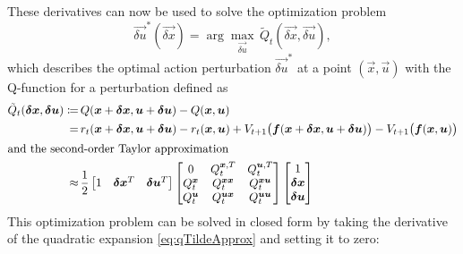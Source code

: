 			These derivatives can now be used to solve the optimization problem
			\begin{equation*}
				\vec{\delta u}^\ast(\vec{\delta x}) = \arg\max_{\vec{\delta u}}\, \tilde{Q}_t(\vec{\delta x}, \vec{\delta u}),
			\end{equation*}
			which describes the optimal action perturbation \( \vec{\delta u}^\ast \) at a point \( (\vec{x}, \vec{u}) \) with the Q-function for a perturbation defined as
			\begin{align}
				\tilde{Q}_t(\vec{\delta x}, \vec{\delta u})
				\coloneqq & \, Q(\vec{x} + \vec{\delta x}, \vec{u} + \vec{\delta u}) - Q(\vec{x}, \vec{u})  \nonumber                                                                                                                                          \\
				=         & \, r_t(\vec{x} + \vec{\delta x}, \vec{u} + \vec{\delta u}) - r_t(\vec{x}, \vec{u}) + V_{t + 1}\big( \vec{f}(\vec{x} + \vec{\delta x}, \vec{u} + \vec{\delta u}) \big) -  V_{t + 1}\big( \vec{f}(\vec{x}, \vec{u}) \big)  \nonumber \\
				\intertext{and the second-order Taylor approximation}
				\approx   & \, \frac{1}{2}
				\begin{bmatrix}
					1 & \vec{\delta x}^T & \vec{\delta u}^T
				\end{bmatrix}
				\begin{bmatrix}
					0             & Q_t^{\vec{x}, T}      & Q_t^{\vec{u}, T}      \\
					Q_t^{\vec{x}} & Q_t^{\vec{x} \vec{x}} & Q_t^{\vec{x} \vec{u}} \\
					Q_t^{\vec{u}} & Q_t^{\vec{u} \vec{x}} & Q_t^{\vec{u} \vec{u}}
				\end{bmatrix}
				\begin{bmatrix}
					1              \\
					\vec{\delta x} \\
					\vec{\delta u}
				\end{bmatrix}  \label{eq:qTildeApprox}
			\end{align}
			This optimization problem can be solved in closed form by taking the derivative of the quadratic expansion \eqref{eq:qTildeApprox} and setting it to zero:
